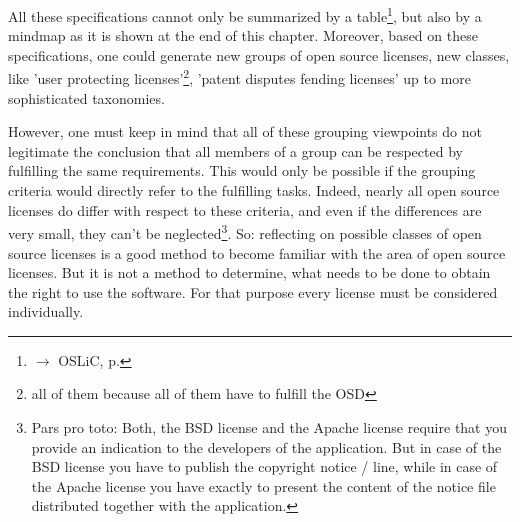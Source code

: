 All these specifications cannot only be summarized by a
table\footnote{$\rightarrow$ OSLiC, p. \pageref{tab:powerOfLicenses}}, but also
by a mindmap as it is shown at the end of this chapter. Moreover, based on these
specifications, one could generate new groups of open source licenses, new
classes, like 'user protecting licenses'\footnote{all of them because all of
them have to fulfill the OSD}, 'patent disputes fending licenses' up to more
sophisticated taxonomies.

However, one must keep in mind that all of these grouping viewpoints do not
legitimate the conclusion that all members of a group can be respected by
fulfilling the same requirements. This would only be possible if the grouping
criteria would directly refer to the fulfilling tasks. Indeed, nearly all open
source licenses do differ with respect to these criteria, and even if the
differences are very small, they can't be neglected\footnote{Pars pro toto:
Both, the BSD license and the Apache license require that you provide an
indication to the developers of the application. But in case of the BSD license
you have to publish the copyright notice / line, while in case of the Apache
license you have exactly to present the content of the notice file distributed
together with the application.}. So: reflecting on possible classes of open
source licenses is a good method to become familiar with the area of open source
licenses. But it is not a method to determine, what needs to be done to
obtain the right to use the software. For that purpose every license must be
considered individually.


